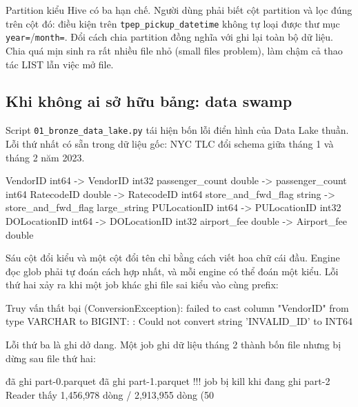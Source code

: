 \documentclass[12pt]{article}
\begin{document}
Partition kiểu Hive có ba hạn chế. Người dùng phải biết cột partition và lọc đúng trên cột đó: điều kiện trên \texttt{tpep\_pickup\_datetime} không tự loại được thư mục \texttt{year=}/\texttt{month=}. Đổi cách chia partition đồng nghĩa với ghi lại toàn bộ dữ liệu. Chia quá mịn sinh ra rất nhiều file nhỏ (small files problem), làm chậm cả thao tác LIST lẫn việc mở file.

\subsection{Khi không ai sở hữu bảng: data swamp}

Script \texttt{01\_bronze\_data\_lake.py} tái hiện bốn lỗi điển hình của Data Lake thuần. Lỗi thứ nhất có sẵn trong dữ liệu gốc: NYC TLC đổi schema giữa tháng 1 và tháng 2 năm 2023.

\begin{aivnCodeOutput}
\begin{python}
  VendorID             int64    ->  VendorID             int32
  passenger_count      double   ->  passenger_count      int64
  RatecodeID           double   ->  RatecodeID           int64
  store_and_fwd_flag   string   ->  store_and_fwd_flag   large_string
  PULocationID         int64    ->  PULocationID         int32
  DOLocationID         int64    ->  DOLocationID         int32
  airport_fee          double   ->  Airport_fee          double
\end{python}
\end{aivnCodeOutput}

Sáu cột đổi kiểu và một cột đổi tên chỉ bằng cách viết hoa chữ cái đầu. Engine đọc glob phải tự đoán cách hợp nhất, và mỗi engine có thể đoán một kiểu. Lỗi thứ hai xảy ra khi một job khác ghi file sai kiểu vào cùng prefix:

\begin{aivnCodeOutput}
\begin{python}
Truy vấn thất bại (ConversionException): failed to cast column "VendorID" from type
VARCHAR to BIGINT: : Could not convert string 'INVALID_ID' to INT64
\end{python}
\end{aivnCodeOutput}

Lỗi thứ ba là ghi dở dang. Một job ghi dữ liệu tháng 2 thành bốn file nhưng bị dừng sau file thứ hai:

\begin{aivnCodeOutput}
\begin{python}
  đã ghi part-0.parquet
  đã ghi part-1.parquet
  !!! job bị kill khi đang ghi part-2
Reader thấy 1,456,978 dòng / 2,913,955 dòng (50%
\end{python}
\end{aivnCodeOutput}
\end{document}
